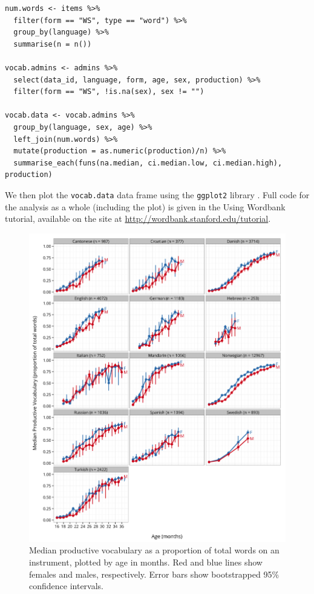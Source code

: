 \documentclass[doc,noapacite]{apa2}
\newcommand{\comment}[1]{\marginpar[]{\small \textcolor{blue}{#1}}}
\begin{document}
\begin{lstlisting}
num.words <- items %>%
  filter(form == "WS", type == "word") %>%
  group_by(language) %>%
  summarise(n = n())

vocab.admins <- admins %>%
  select(data_id, language, form, age, sex, production) %>%
  filter(form == "WS", !is.na(sex), sex != "")

vocab.data <- vocab.admins %>%
  group_by(language, sex, age) %>%
  left_join(num.words) %>%
  mutate(production = as.numeric(production)/n) %>%
  summarise_each(funs(na.median, ci.median.low, ci.median.high), production)
\end{lstlisting}

\noindent We then plot the \texttt{vocab.data} data frame using the \texttt{ggplot2} library \cite{wickham2009}. Full code for the analysis as a whole (including the plot) is given in the Using Wordbank tutorial, available on the site at \url{http://wordbank.stanford.edu/tutorial}. \comment{Update if package works differently.}

\begin{figure}[h!]
\includegraphics[width=6in]{figures/sex.png}
\caption{\label{fig:sex} Median productive vocabulary as a proportion of total words on an instrument, plotted by age in months. Red and blue lines show females and males, respectively. Error bars show bootstrapped 95\% confidence intervals.}
\end{figure}
\end{document}
